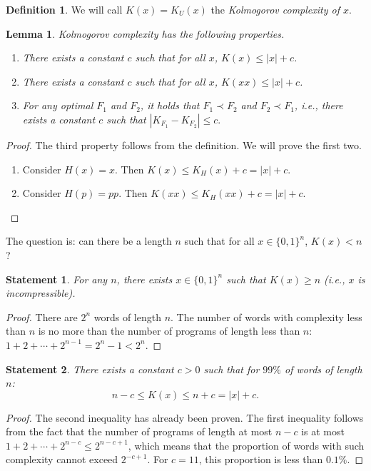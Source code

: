 \documentclass[12pt,sans]{article}
\theoremstyle{definition}
\newtheorem{definition}{Definition}[section]
\theoremstyle{plain}
\newtheorem{lemma}{Lemma}[section]
\newtheorem{statement}{Statement}[section]
\theoremstyle{remark}
\begin{document}
\begin{definition}
    We will call $K(x) = K_U(x)$ the \emph{Kolmogorov complexity of $x$}.
\end{definition}

\begin{lemma} Kolmogorov complexity has the following properties.
    \begin{enumerate}
        \item There exists a constant $c$ such that for all $x$, $K(x) \le |x| + c$.
        \item There exists a constant $c$ such that for all $x$, $K(xx) \le |x| + c$.
        \item For any optimal $F_1$ and $F_2$, it holds that $F_1 \prec F_2$ and $F_2 \prec F_1$, i.e., there exists a constant $c$ such that
        \(
        |K_{F_1} - K_{F_2}| \le c.
        \)
    \end{enumerate}
\end{lemma}

\begin{proof} The third property follows from the definition. We will prove the first two.
    \begin{enumerate}
        \item Consider $H(x) = x$. Then
        \(K(x) \le K_H(x) + c = |x| + c\).
        \item Consider $H(p) = pp$. Then
        \(K(xx) \le K_H(xx) + c = |x| + c\).    \qedhere
    \end{enumerate}
\end{proof}

The question is: can there be a length $n$ such that for all $x \in \{0,1\}^n$, $K(x) < n$?
\begin{statement}
    For any $n$, there exists $x \in \{0,1\}^n$ such that $K(x) \ge n$ (i.e., $x$ is incompressible).
\end{statement}
\begin{proof}
    There are $2^n$ words of length $n$. The number of words with complexity less than $n$ is no more than the number of programs of length less than $n$:
    \(
    1 + 2 + \dotsb + 2^{n-1} = 2^n - 1 < 2^n.
    \)\qedhere
\end{proof}

\begin{statement}
    There exists a constant $c > 0$ such that for $99\%$ of words of length $n$:
    \[
    n - c \le K(x) \le n + c = |x| + c.
    \]
\end{statement}
\begin{proof}
    The second inequality has already been proven. The first inequality follows from the fact that the number of programs of length at most $n - c$ is at most $1 + 2 + \dotsb + 2^{n-c} \le 2^{n - c + 1}$, which means that the proportion of words with such complexity cannot exceed $2^{-c + 1}$. For $c = 11$, this proportion is less than $0.1\%$.
\end{proof}
\end{document}

